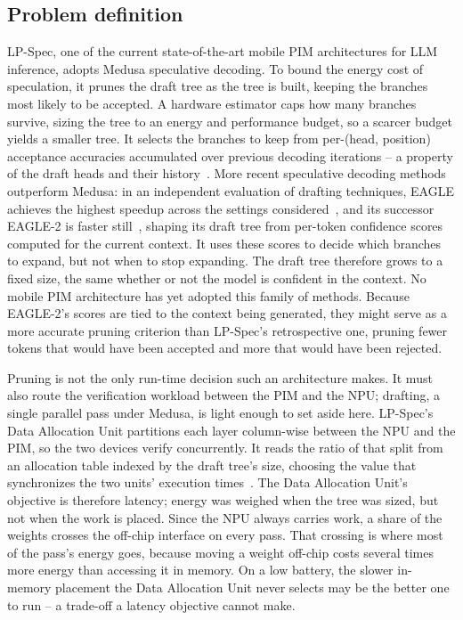 \documentclass[11pt]{article}
\begin{document}
\subsection{Problem definition}
LP-Spec, one of the current state-of-the-art mobile PIM architectures for LLM inference, adopts Medusa speculative decoding. To bound the energy cost of speculation, it prunes the draft tree as the tree is built, keeping the branches most likely to be accepted. A hardware estimator caps how many branches survive, sizing the tree to an energy and performance budget, so a scarcer budget yields a smaller tree. It selects the branches to keep from per-(head, position) acceptance accuracies accumulated over previous decoding iterations -- a property of the draft heads and their history~\cite{he2025lpspec}. More recent speculative decoding methods outperform Medusa: in an independent evaluation of drafting techniques, EAGLE achieves the highest speedup across the settings considered~\cite{xia2024survey}, and its successor EAGLE-2 is faster still~\cite{li2024eagle2}, shaping its draft tree from per-token confidence scores computed for the current context. It uses these scores to decide which branches to expand, but not when to stop expanding. The draft tree therefore grows to a fixed size, the same whether or not the model is confident in the context. No mobile PIM architecture has yet adopted this family of methods. Because EAGLE-2's scores are tied to the context being generated, they might serve as a more accurate pruning criterion than LP-Spec's retrospective one, pruning fewer tokens that would have been accepted and more that would have been rejected.

Pruning is not the only run-time decision such an architecture makes. It must also route the verification workload between the PIM and the NPU; drafting, a single parallel pass under Medusa, is light enough to set aside here. LP-Spec's Data Allocation Unit partitions each layer column-wise between the NPU and the PIM, so the two devices verify concurrently. It reads the ratio of that split from an allocation table indexed by the draft tree's size, choosing the value that synchronizes the two units' execution times~\cite{he2025lpspec}. The Data Allocation Unit's objective is therefore latency; energy was weighed when the tree was sized, but not when the work is placed. Since the NPU always carries work, a share of the weights crosses the off-chip interface on every pass. That crossing is where most of the pass's energy goes, because moving a weight off-chip costs several times more energy than accessing it in memory. On a low battery, the slower in-memory placement the Data Allocation Unit never selects may be the better one to run -- a trade-off a latency objective cannot make.
\end{document}

